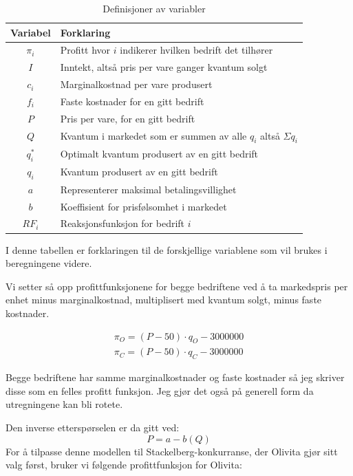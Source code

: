 \documentclass[
  12pt,
  a4paper,
  DIV=11,
  numbers=noendperiod]{scrartcl}
\begin{document}
\begin{table}[t]
\centering
\begin{tabular}{|c|l|}
\hline
\textbf{Variabel} & \textbf{Forklaring} \\
\hline
$\pi_i$ & Profitt hvor $i$ indikerer hvilken bedrift det tilhører\\
\hline
$I$ & Inntekt, altså pris per vare ganger kvantum solgt \\
\hline
$c_i$ & Marginalkostnad per vare produsert \\
\hline
$f_i$ & Faste kostnader for en gitt bedrift \\
\hline
$P$ & Pris per vare, for en gitt bedrift \\
\hline
$Q$ & Kvantum i markedet som er summen av alle $q_i$ altså $\Sigma q_i$ \\
\hline
$q_i^*$ & Optimalt kvantum produsert av en gitt bedrift \\
\hline
$q_i$ & Kvantum produsert av en gitt bedrift \\
\hline
$a$ & Representerer maksimal betalingsvillighet \\
\hline
$b$ & Koeffisient for prisfølsomhet i markedet \\
\hline
$RF_i$ & Reaksjonsfunksjon for bedrift $i$ \\
\hline
\end{tabular}
\caption{Definisjoner av variabler}
\label{tab:definitions}
\end{table}

I denne tabellen er forklaringen til de forskjellige variablene som vil
brukes i beregningene videre.

Vi setter så opp profittfunksjonene for begge bedriftene ved å ta
markedspris per enhet minus marginalkostnad, multiplisert med kvantum
solgt, minus faste kostnader.

\begin{align*}
\pi_O=(P-50) \cdot q_O-3000000 \\
\pi_C=(P-50) \cdot q_C-3000000
\end{align*}

Begge bedriftene har samme marginalkostnader og faste kostnader så jeg
skriver disse som en felles profitt funksjon. Jeg gjør det også på
generell form da utregningene kan bli rotete.

Den inverse etterspørselen er da gitt ved: \[
P = a - b(Q)
\] For å tilpasse denne modellen til Stackelberg-konkurranse, der
Olivita gjør sitt valg først, bruker vi følgende profittfunksjon for
Olivita:
\end{document}
